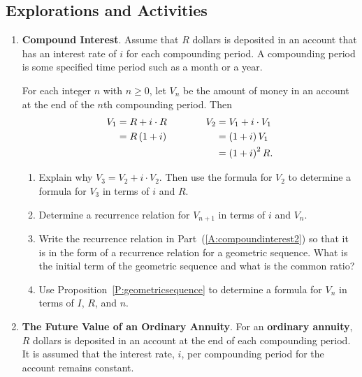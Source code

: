 \subsection*{Explorations and Activities}
\setcounter{oldenumi}{\theenumi}
\begin{enumerate} \setcounter{enumi}{\theoldenumi}
  \item \textbf{Compound Interest}.    \label{exer:compoundinterest}
%
Assume that  $R$  dollars is deposited in an account that has an interest rate of  $i$  for each compounding period.  A compounding period is some specified time period such as a month or a year.

For each integer  $n$  with  $n \geq 0$, let  $V_n $ be the amount of money in an account at the end of the  $n${th}  compounding period.  Then  
\[
\begin{aligned}[t]
V_1  &= R + i \cdot R \\ 
     &= R\left( {1 + i} \right) \\ 
\end{aligned} 
\text{\qquad \qquad}
\begin{aligned}[t]
V_2  &= V_1  + i \cdot V_1  \\ 
     &= \left( {1 + i} \right)V_1  \\ 
     &= \left( {1 + i} \right)^2 R. \\ 
\end{aligned} 
\]
\begin{enumerate}
\item Explain why  $V_3  = V_2  + i \cdot V_2 $.  Then use the formula for  $V_2 $ to determine a formula for  $V_3 $ in terms of  $i$  and   $R$.

\item Determine a recurrence relation for  $V_{n + 1} $ in terms of  $i$  and  $V_n $. \label{A:compoundinterest2}

\item Write the recurrence relation in Part~(\ref{A:compoundinterest2}) so that it is in the form of a recurrence relation for a geometric sequence.  What is the initial term of the geometric sequence and what is the common ratio?

\item Use Proposition~\ref{P:geometricsequence} to determine a formula for  $V_n $ in terms of  $I$, $R$, and  $n$.
\end{enumerate}



\item \textbf{The Future Value of an Ordinary Annuity}.   \label{exer:annuity} 
For an \textbf{ordinary annuity},
%
  $R$  dollars is deposited in an account at the end of each compounding period.  It is assumed that the interest rate, $i$, per compounding period for the account remains constant.


\end{enumerate}
